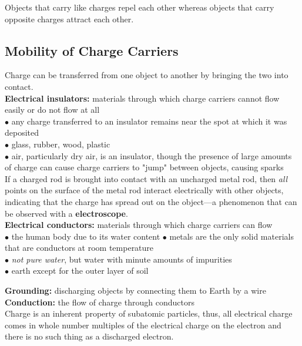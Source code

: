         Objects that carry like charges repel each other whereas objects that carry opposite charges attract each other.

    \subsection{Mobility of Charge Carriers}        %

        Charge can be transferred from one object to another by bringing the two into contact. \\

        \textbf{Electrical insulators:} materials through which charge carriers cannot flow easily or do not flow at all \\
        $\bullet$ any charge transferred to an insulator remains near the spot at which it was deposited \\
        $\bullet$ glass, rubber, wood, plastic \\
        $\bullet$ air, particularly dry air, is an insulator, though the presence of large amounts of charge can cause charge carriers to "jump" between objects, causing sparks \\

        If a charged rod is brought into contact with an uncharged metal rod, then \textit{all} points on the surface of the metal rod interact electrically with other objects, indicating that the charge has spread out
        on the object—a phenomenon that can be observed with a \textbf{electroscope}. \\

        \textbf{Electrical conductors:} materials through which charge carriers can flow \\
        $\bullet$ the human body due to its water content
        $\bullet$ metals are the only solid materials that are conductors at room temperature \\
        $\bullet$ \textit{not pure water}, but water with minute amounts of impurities \\
        $\bullet$ earth except for the outer layer of soil

        \textbf{Grounding:} discharging objects by connecting them to Earth by a wire \\
        \textbf{Conduction:} the flow of charge through conductors \\

        Charge is an inherent property of subatomic particles, thus, all electrical charge comes in whole number multiples of the electrical charge on the electron and there is no such thing as a discharged electron. \\


